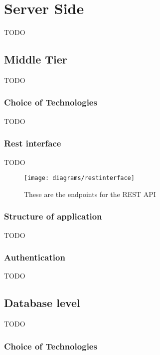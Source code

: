 \section{Server Side}

{TODO}

\subsection{Middle Tier}

{TODO}

\subsubsection*{Choice of Technologies}
\label{sec:node_choice_of_tech}

{TODO}

\subsubsection*{Rest interface}

{TODO}

\begin{figure}[H]
    \centering
    \texttt{[image: diagrams/restinterface]}
    \caption{These are the endpoints for the REST API}
    \label{fig:rest_pai_diagram_image}
\end{figure} 
\noindent

\subsubsection*{Structure of application}

{TODO}

\subsubsection*{Authentication}

{TODO}

\subsection{Database level}

{TODO}

\subsubsection*{Choice of Technologies}
\label{sec:database_choice_of_tech}

